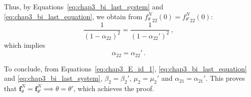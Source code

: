 \begin{subappendices}
Thus, by Equations~\eqref{eq:chap3_bi_last_system} and \eqref{eq:chap3_bi_last_equation}, we obtain from ${f_\theta^N}_{22}(0) = {f_{\theta'}^N}_{22}(0)$:
\[
\frac{1}{(1-\alpha_{22})^2} = \frac{1}{(1-\alpha_{22}')^2} \,,
\]
which implies
\[
\alpha_{22} = \alpha_{22}' \,.
\]

To conclude, from Equations~\eqref{eq:chap3_E_id_1}, \eqref{eq:chap3_bi_last_equation} and \eqref{eq:chap3_bi_last_system},
$\beta_2 = \beta_2'$, $\mu_2 = \mu_2'$ and $\alpha_{21} = \alpha_{21}'$.
This proves that $\mathbf{f}_\theta^N = \mathbf{f}_{\theta'}^N \implies \theta = \theta'$, which achieves the proof.

\end{subappendices}